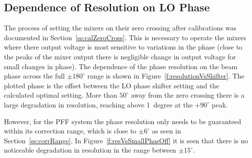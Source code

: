 \subsection{Dependence of Resolution on LO Phase}
\label{ss:resVsShifter}

The process of setting the mixers on their zero crossing after calibrations was documented in Section~\ref{ss:calZeroCross}. This is necessary to operate the mixers where there output voltage is most sensitive to variations in the phase (close to the peaks of the mixer output there is negligible change in output voltage for small changes in phase). The dependence of the phase resolution on the beam phase across the full \(\pm180^\circ\) range is shown in Figure~\ref{f:resolutionVsShifter}. The plotted phase is the offset between the LO phase shifter setting and the calculated optimal setting. More than \(50^\circ\) away from the zero crossing there is a large degradation in resolution, reaching above 1~degree at the \(+90^\circ\) peak.

However, for the PFF system the phase resolution only needs to be guaranteed within its correction range, which is close to \(\pm6^\circ\) as seen in Section~\ref{ss:corrRange}. In Figure~\ref{f:resVsSmallPhasOff} it is seen that there is no noticeable degradation in resolution in the range between \(\pm15^\circ\).

